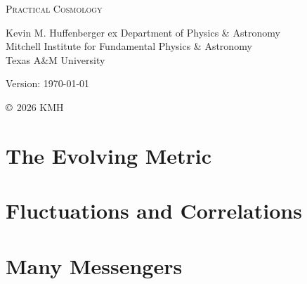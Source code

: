 \documentclass[oneside]{book}
\begin{document}
 

\begin{titlepage}
\begin{center}
  \vfill
  
  {\LARGE \textsc{Practical Cosmology}}

  \vfill
    \vfill

  Kevin M. Huffenberger
   ex 
  Department of Physics \& Astronomy \\
  Mitchell Institute for Fundamental Physics \& Astronomy \\
  Texas A\&M University
  \vfill

  \vfill
  Version: \today
  \vfill
  \vfill
  
  $\copyright$ 2026 KMH
\end{center}

\end{titlepage}



 {}
\tableofcontents
 


\part{The Evolving Metric}







\part{Fluctuations and Correlations}







\part{Many Messengers}










 
\printindex

 
\end{document}
